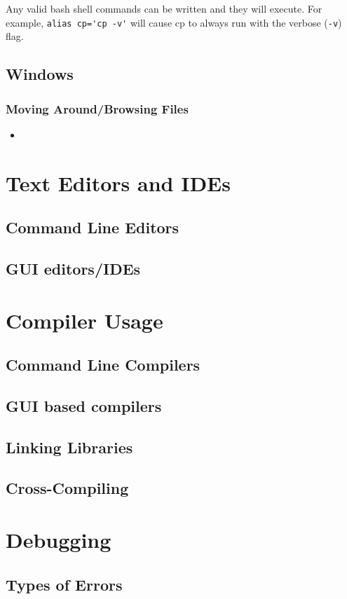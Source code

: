 \documentclass[12pt]{book}
\begin{document}
				Any valid bash shell commands can be written and they will execute.  For example, \verb+alias cp='cp -v'+ will cause cp to always run with the verbose (\verb+-v+) flag.
					
		\section{Windows}
			\subsection{Moving Around/Browsing Files}
				\begin{itemize}
					\item 
				\end{itemize}
	\chapter{Text Editors and IDEs}
		\section{Command Line Editors}
		\section{GUI editors/IDEs}
		
	\chapter{Compiler Usage}
		\section{Command Line Compilers}
		\section{GUI based compilers}
		\section{Linking Libraries}
		\section{Cross-Compiling}
		
	\chapter{Debugging}
		\section{Types of Errors}
\end{document}
